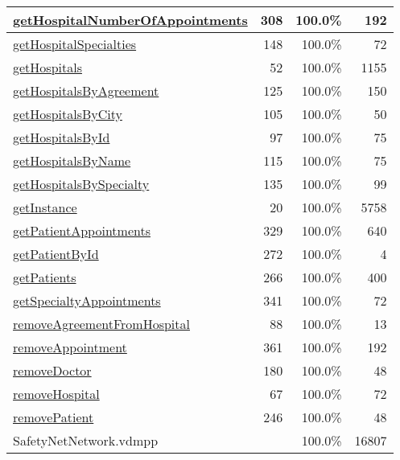\begin{longtable}{|l|r|r|r|}
\hline
\hyperref[getHospitalNumberOfAppointments:308]{getHospitalNumberOfAppointments} & 308&100.0\% & 192 \\
\hline
\hyperref[getHospitalSpecialties:148]{getHospitalSpecialties} & 148&100.0\% & 72 \\
\hline
\hyperref[getHospitals:52]{getHospitals} & 52&100.0\% & 1155 \\
\hline
\hyperref[getHospitalsByAgreement:125]{getHospitalsByAgreement} & 125&100.0\% & 150 \\
\hline
\hyperref[getHospitalsByCity:105]{getHospitalsByCity} & 105&100.0\% & 50 \\
\hline
\hyperref[getHospitalsById:97]{getHospitalsById} & 97&100.0\% & 75 \\
\hline
\hyperref[getHospitalsByName:115]{getHospitalsByName} & 115&100.0\% & 75 \\
\hline
\hyperref[getHospitalsBySpecialty:135]{getHospitalsBySpecialty} & 135&100.0\% & 99 \\
\hline
\hyperref[getInstance:20]{getInstance} & 20&100.0\% & 5758 \\
\hline
\hyperref[getPatientAppointments:329]{getPatientAppointments} & 329&100.0\% & 640 \\
\hline
\hyperref[getPatientById:272]{getPatientById} & 272&100.0\% & 4 \\
\hline
\hyperref[getPatients:266]{getPatients} & 266&100.0\% & 400 \\
\hline
\hyperref[getSpecialtyAppointments:341]{getSpecialtyAppointments} & 341&100.0\% & 72 \\
\hline
\hyperref[removeAgreementFromHospital:88]{removeAgreementFromHospital} & 88&100.0\% & 13 \\
\hline
\hyperref[removeAppointment:361]{removeAppointment} & 361&100.0\% & 192 \\
\hline
\hyperref[removeDoctor:180]{removeDoctor} & 180&100.0\% & 48 \\
\hline
\hyperref[removeHospital:67]{removeHospital} & 67&100.0\% & 72 \\
\hline
\hyperref[removePatient:246]{removePatient} & 246&100.0\% & 48 \\
\hline
\hline
SafetyNetNetwork.vdmpp & & 100.0\% & 16807 \\
\hline
\end{longtable}

